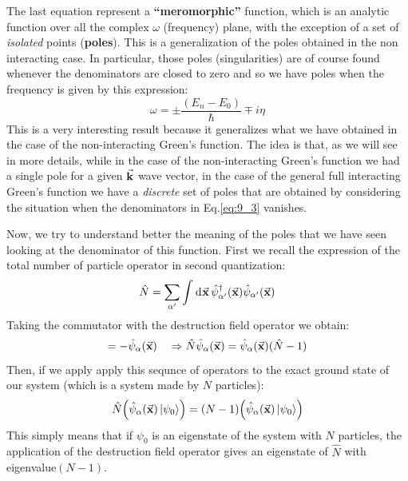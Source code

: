 \documentclass[../main/main.tex]{subfiles}
\begin{document}
The last equation represent a \textbf{“meromorphic”} function, which is an analytic function over all the complex \( \omega  \) (frequency) plane, with the exception of a set of \emph{isolated} points (\textbf{poles}).
This is a generalization of the poles obtained in the non interacting case.
In particular, those poles (singularities) are of course found whenever the denominators are closed to zero and so we have poles when the frequency is given by this expression:
\begin{equation*}
  \omega = \pm \frac{(E_n-E_0)}{\hbar } \mp i \eta
\end{equation*}
This is a very interesting result because it generalizes what we have obtained in the case of the non-interacting Green's function.
The idea is that, as we will see in more details, while in the case of the non-interacting Green's function we had a single pole for a given \( \va{k} \) wave vector, in the case of the general full interacting Green's function we have a \emph{discrete} set of poles that are obtained by considering the situation when the denominators in Eq.\eqref{eq:9_3} vanishes.



Now, we try to understand better the meaning of the poles that we have seen looking at the denominator of this function.
First we recall the expression of the total number of particle operator in second quantization:
\begin{equation*}
  \hat{N} = \sum_{\alpha'}^{} \int_{}^{} \dd[]{\va{x}} \hat{\psi }_{\alpha'}^\dag (\va{x}) \hat{\psi }_{\alpha' } (\va{x})
\end{equation*}
Taking the commutator with the destruction field operator we obtain:
\begin{equation*}
  [\hat{N}, \hat{\psi }_{\alpha } (\va{x})] = - \hat{\psi }_{\alpha } (\va{x}) \quad \Rightarrow \hat{N} \hat{\psi }_{\alpha} (\va{x})  = \hat{\psi }_{\alpha } (\va{x}) (\hat{N}-1 )
\end{equation*}
Then, if we apply apply this sequnce of operators to the exact ground state of our system (which is a system made by \( N \) particles):
\begin{equation*}
  \hat{N}   \qty(  \hat{\psi }_{\alpha } (\va{x}) \ket{\psi _0} ) = (N-1) \qty(  \hat{\psi }_{\alpha } (\va{x}) \ket{\psi _0} )
\end{equation*}
This simply means that if \( \psi _0  \) is an eigenstate of the system with \( N \) particles, the application of the destruction field operator gives an eigenstate of \( \hat{N}  \) with eigenvalue\( (N-1) \).
\end{document}

